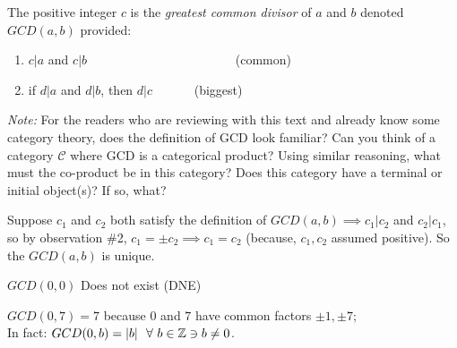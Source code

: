\newpage
\begin{definition}
The positive integer $c$ is the \textit{greatest common divisor} of $a$ and $b$ denoted $GCD(a,b)$
provided:
\begin{enumerate}[label=\roman*)]
    \item $c|a$ and $c|b$      \ \ \ \ \ \ \ \ \ \ \ \ \ \ \ \ \ \ \ \ \ \ \ (common)
    \item if $d|a$ and $d|b$, then $d|c$ \ \ \ \ \ \  (biggest)
\end{enumerate}
\end{definition}
\textit{Note:}\label{note:ch1-gcd-teaser} For the readers who are reviewing with this text and already know some category
theory, does the definition of GCD look familiar? Can you think of a category $\mathcal{C}$ where
GCD is a categorical product? Using similar reasoning, what must the co-product be in this category?
Does this category have a terminal or initial object(s)? If so, what?
\begin{proposition}
Suppose $c_1$ and $c_2$ both satisfy the definition of $GCD(a,b) \implies c_1|c_2$ and $c_2|c_1$, so
by observation \#2, $c_1=\pm c_2 \implies c_1=c_2$ (because, $c_1,c_2$ assumed positive). So the
$GCD(a,b)$ is unique.
\end{proposition}
\begin{example}
$GCD(0,0)$ Does not exist (DNE)
\end{example}
\begin{example}
$GCD(0,7)=7$ because $0$ and $7$ have common factors $\pm 1,\pm 7$; \\
In fact: $GCD(0, b)=|b| \ \ \forall \ b\in {\mathbb{Z}}\ni b\neq 0$.
\end{example}


